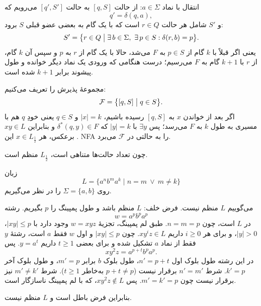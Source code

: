 انتقال با نماد $a \in \Sigma$:
از حالت $[q,S]$ به حالت $[q',S']$ می‌رویم که
\[
q' = \delta(q,a),
\]
و $S'$ شامل هر حالت $r \in Q$ است که با یک گام به بعضی عضو قبلی $S$ برود:
\[
S' = \bigl\{ r \in Q \bigm| \exists\, b \in \Sigma,\ \exists\, p \in S : \delta(r,b) = p \bigr\}.
\]
یعنی اگر قبلاً با $k$ گام از $p \in S$ به $F$ می‌شد، حالا با یک گام از $r$ به $p$ و سپس آن $k$ گام، از $r$ با $k{+}1$ گام به $F$ می‌رسیم؛ درست هنگامی که ورودی یک نماد دیگر خوانده و طول پیشوند برابر $k{+}1$ شده است.

مجموعهٔ پذیرش را تعریف می‌کنیم:
\[
\mathcal{F} = \bigl\{ [q,S] \bigm| q \in S \bigr\}.
\]
اگر بعد از خواندن $x$ به $[q,S]$ رسیده باشیم، $|x| = k$ و $q \in S$ یعنی خودِ $q$ هم با مسیری به طول $k$ به $F$ می‌رسد؛ پس $\exists y$ با $|y| = k$ که $\delta^*(q,y) \in F$ و بنابراین $xy \in L$. برعکس، هر $x \in L_{\frac{1}{2}}$ این NFA را به حالتی در $\mathcal{F}$ می‌برد.

چون تعداد حالت‌ها متناهی است، $L_{\frac{1}{2}}$ منظم است.



زبان
\[
L = \{ a^n b^m a^k \mid n = m \ \lor\ m \neq k \}
\]
روی $\Sigma = \{a,b\}$ را در نظر می‌گیریم.

می‌گوییم $L$ منظم {نیست}.
فرض خلف: $L$ منظم باشد و طول پمپینگ را $p$ بگیریم.
رشته
\[
w = a^p b^p a^p
\]
در $L$ است، چون $n = m = p$.
طبق لم پمپینگ، تجزیهٔ $w = xyz$ وجود دارد با $|xy| \le p$، $|y| > 0$، و برای هر $i \ge 0$ داریم $xy^i z \in L$.
چون $|xy| \le p$ و اول $w$ فقط $a$ است، رشتهٔ $y$ فقط از نماد $a$ تشکیل شده و برای بعضی $t \ge 1$ داریم $y = a^t$.
پس
\[
xy^2 z = a^{p+t} b^p a^p.
\]
در این رشته طول بلوک اول $n' = p+t$، طول بلوک $b$ برابر $m' = p$، و طول بلوک آخر $k' = p$.
شرط $n' = m'$ برقرار نیست ($p+t \neq p$ به‌خاطر $t \ge 1$).
شرط $m' \neq k'$ نیز برقرار نیست چون $m' = k' = p$.
پس $xy^2 z \notin L$، که با لم پمپینگ ناسازگار است.

بنابراین فرض باطل است و $L$ منظم نیست.
